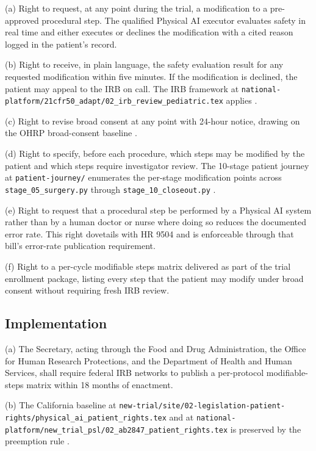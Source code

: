 (a) Right to request, at any point during the trial, a modification
to a pre-approved procedural step. The qualified Physical AI executor
evaluates safety in real time and either executes or declines the
modification with a cited reason logged in the patient's record.

(b) Right to receive, in plain language, the safety evaluation
result for any requested modification within five minutes. If the
modification is declined, the patient may appeal to the IRB on call.
The IRB framework at
\texttt{national-platform/21cfr50\_adapt/02\_irb\_review\_pediatric.tex}
applies \cite{kawchak_2026_19040707}.

(c) Right to revise broad consent at any point with 24-hour notice,
drawing on the OHRP broad-consent baseline
\cite{ohrp_broad_consent_attachment_c_2017}.

(d) Right to specify, before each procedure, which steps may be
modified by the patient and which steps require investigator review.
The 10-stage patient journey at \texttt{patient-journey/} enumerates
the per-stage modification points across
\texttt{stage\_05\_surgery.py} through
\texttt{stage\_10\_closeout.py} \cite{kawchak_2026_19119939}.

(e) Right to request that a procedural step be performed by a
Physical AI system rather than by a human doctor or nurse where doing
so reduces the documented error rate. This right dovetails with HR
9504 and is enforceable through that bill's error-rate publication
requirement.

(f) Right to a per-cycle modifiable steps matrix delivered as part
of the trial enrollment package, listing every step that the patient
may modify under broad consent without requiring fresh IRB review.

\subsection{Implementation}

(a) The Secretary, acting through the Food and Drug Administration,
the Office for Human Research Protections, and the Department of
Health and Human Services, shall require federal IRB networks to
publish a per-protocol modifiable-steps matrix within 18 months of
enactment.

(b) The California baseline at
\texttt{new-trial/site/02-legislation-patient-rights/physical\_ai\_patient\_rights.tex}
and at
\texttt{national-platform/new\_trial\_psl/02\_ab2847\_patient\_rights.tex}
is preserved by the preemption rule \cite{kawchak_2026_19176370}.

